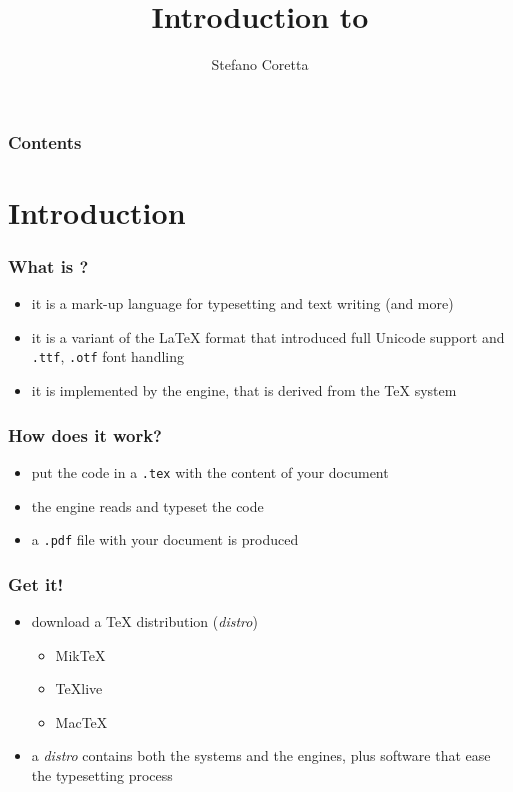 \documentclass{beamer}
\title{Introduction to \XeLaTeX}
\author{Stefano Coretta}
\begin{document}
\begin{frame}
	\maketitle
\end{frame}

\begin{frame}
	\frametitle{Contents}
	\tableofcontents
\end{frame}

\section{Introduction}

\begin{frame}
	\frametitle{What is \XeLaTeX{}?}
	
\begin{itemize}
\item it is a mark-up language for typesetting and text writing (and more)
\item it is a variant of the \LaTeX{} format that introduced full Unicode support and \texttt{.ttf}, \texttt{.otf} font handling
\item it is implemented by the \XeTeX{} engine, that is derived from the \TeX{} system
\end{itemize}

\end{frame}

\begin{frame}
	\frametitle{How does it work?}
	
\begin{itemize}
\item put the \XeLaTeX{} code in a \texttt{.tex} with the content of your document
\item the \XeTeX{} engine reads and typeset the code
\item a \texttt{.pdf} file with your document is produced
\end{itemize}

\end{frame}

\begin{frame}
	\frametitle{Get it!}
	
\begin{itemize}
\item download a \TeX{} distribution (\textit{distro})
\begin{itemize}
\item MikTeX
\item TeXlive 
\item MacTeX
\end{itemize}
\item a \textit{distro} contains both the systems and the engines, plus software that ease the typesetting process
\end{itemize}

\end{frame}
\end{document}
